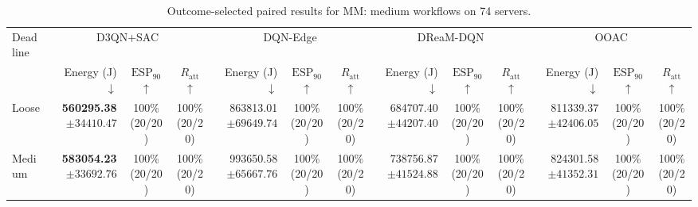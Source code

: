 \documentclass[10pt]{article}
\begin{document}
\begin{table}[!htbp]
\centering
\caption{Outcome-selected paired results for MM: medium workflows on 74 servers.}
\label{tab:conditional_case_mm}
\begingroup
\footnotesize
\setlength{\tabcolsep}{2.2pt}
\renewcommand{\arraystretch}{1.08}
\begin{tabular}{@{}l*{4}{rcc}@{}}
\toprule
Deadline & \multicolumn{3}{c}{D3QN+SAC} & \multicolumn{3}{c}{DQN-Edge} & \multicolumn{3}{c}{DReaM-DQN} & \multicolumn{3}{c}{OOAC} \\
\cmidrule(lr){2-4}\cmidrule(lr){5-7}\cmidrule(lr){8-10}\cmidrule(lr){11-13}
 & Energy (J) $\downarrow$ & $\mathrm{ESP}_{90}$ $\uparrow$ & $R_{\mathrm{att}}$ $\uparrow$ & Energy (J) $\downarrow$ & $\mathrm{ESP}_{90}$ $\uparrow$ & $R_{\mathrm{att}}$ $\uparrow$ & Energy (J) $\downarrow$ & $\mathrm{ESP}_{90}$ $\uparrow$ & $R_{\mathrm{att}}$ $\uparrow$ & Energy (J) $\downarrow$ & $\mathrm{ESP}_{90}$ $\uparrow$ & $R_{\mathrm{att}}$ $\uparrow$ \\
\midrule
Loose & \shortstack[r]{\textbf{560295.38}\\$\pm 34410.47$} & \shortstack[c]{100\%\\(20/20)} & \shortstack[c]{100\%\\(20/20)} & \shortstack[r]{863813.01\\$\pm 69649.74$} & \shortstack[c]{100\%\\(20/20)} & \shortstack[c]{100\%\\(20/20)} & \shortstack[r]{684707.40\\$\pm 44207.40$} & \shortstack[c]{100\%\\(20/20)} & \shortstack[c]{100\%\\(20/20)} & \shortstack[r]{811339.37\\$\pm 42406.05$} & \shortstack[c]{100\%\\(20/20)} & \shortstack[c]{100\%\\(20/20)} \\
Medium & \shortstack[r]{\textbf{583054.23}\\$\pm 33692.76$} & \shortstack[c]{100\%\\(20/20)} & \shortstack[c]{100\%\\(20/20)} & \shortstack[r]{993650.58\\$\pm 65667.76$} & \shortstack[c]{100\%\\(20/20)} & \shortstack[c]{100\%\\(20/20)} & \shortstack[r]{738756.87\\$\pm 41524.88$} & \shortstack[c]{100\%\\(20/20)} & \shortstack[c]{100\%\\(20/20)} & \shortstack[r]{824301.58\\$\pm 41352.31$} & \shortstack[c]{100\%\\(20/20)} & \shortstack[c]{100\%\\(20/20)} \\

\end{tabular}
\end{table}
\end{document}
